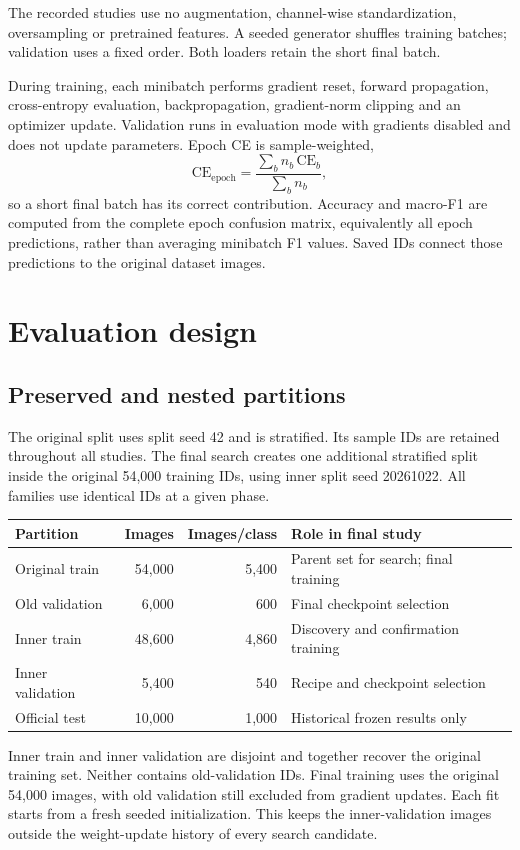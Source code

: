 The recorded studies use no augmentation, channel-wise standardization, oversampling or pretrained features. A seeded generator shuffles training batches; validation uses a fixed order. Both loaders retain the short final batch.

During training, each minibatch performs gradient reset, forward propagation, cross-entropy evaluation, backpropagation, gradient-norm clipping and an optimizer update. Validation runs in evaluation mode with gradients disabled and does not update parameters. Epoch CE is sample-weighted,
\[
\mathrm{CE}_{\mathrm{epoch}}=\frac{\sum_b n_b\,\mathrm{CE}_b}{\sum_b n_b},
\]
so a short final batch has its correct contribution. Accuracy and macro-F1 are computed from the complete epoch confusion matrix, equivalently all epoch predictions, rather than averaging minibatch F1 values. Saved IDs connect those predictions to the original dataset images.

\bigskip
\section{Evaluation design}
\subsection{Preserved and nested partitions}
The original split uses split seed 42 and is stratified. Its sample IDs are retained throughout all studies. The final search creates one additional stratified split inside the original 54,000 training IDs, using inner split seed 20261022. All families use identical IDs at a given phase.

\begin{center}
\small
\begin{tabular}{lrrl}
\toprule
Partition & Images & Images/class & Role in final study \\
\midrule
Original train & 54,000 & 5,400 & Parent set for search; final training \\
Old validation & 6,000 & 600 & Final checkpoint selection \\
Inner train & 48,600 & 4,860 & Discovery and confirmation training \\
Inner validation & 5,400 & 540 & Recipe and checkpoint selection \\
Official test & 10,000 & 1,000 & Historical frozen results only \\
\bottomrule
\end{tabular}
\end{center}
Inner train and inner validation are disjoint and together recover the original training set. Neither contains old-validation IDs. Final training uses the original 54,000 images, with old validation still excluded from gradient updates. Each fit starts from a fresh seeded initialization. This keeps the inner-validation images outside the weight-update history of every search candidate.

